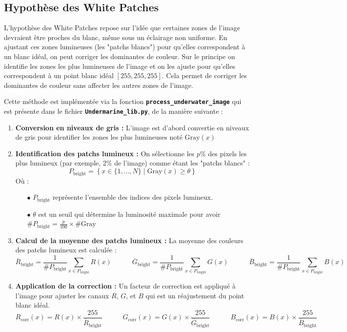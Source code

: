 \documentclass[10pt, a4paper]{extarticle}
\numberwithin{equation}{section}
\numberwithin{figure}{section}
\begin{document}
\subsection{Hypothèse des White Patches}\label{WP}

L’hypothèse des White Patches repose sur l’idée que certaines zones de l’image devraient être proches du blanc, même sous un éclairage non uniforme. En ajustant ces zones lumineuses (les "patchs blancs") pour qu'elles correspondent à un blanc idéal, on peut corriger les dominantes de couleur. Sur le principe on identifie les zones les plus lumineuses de l’image et on les ajuste pour qu’elles correspondent à un point blanc idéal \([255, 255, 255]\). Cela permet de corriger les dominantes de couleur sans affecter les autres zones de l’image.
\par Cette méthode est implémentée via la fonction \colorbox{gray!15}{\texttt{\textbf{process\_underwater\_image}}} qui est présente dans le fichier \colorbox{gray!15}{\texttt{\textbf{Undermarine\_lib.py}}}, de la manière suivante :

\begin{enumerate}
    \item \textbf{Conversion en niveaux de gris :} L'image est d'abord convertie en niveaux de gris pour identifier les zones les plus lumineuses noté $\text{Gray}(x)$
    
    \item \textbf{Identification des patchs lumineux :} On sélectionne les \( p\% \) des pixels les plus lumineux (par exemple, 2\% de l'image) comme étant les "patchs blancs" :
    \[
P_{\text{bright}} = \left\{ x \in \{1, \dots, N\} \mid \text{Gray}(x) \geq \theta \right\}
\]
Où :
\begin{itemize}
    \item[$\bullet$] \( P_{\text{bright}} \) représente l'ensemble des indices des pixels lumineux.
    \item[$\bullet$] \( \theta \) est un seuil qui détermine la luminosité maximale pour avoir $\#P_{\text{bright}} = \frac{p}{100} \times \#\text{Gray}$
\end{itemize}

    \item \textbf{Calcul de la moyenne des patchs lumineux :} La moyenne des couleurs des patchs lumineux est calculée :
    $$
    \bar{R}_{\text{bright}} = \frac{1}{\#P_{\text{bright}}} \sum_{x\in P_{\text{bright}}} R(x) \quad\quad\quad \bar{G}_{\text{bright}} = \frac{1}{\#P_{\text{bright}}} \sum_{x\in P_{\text{bright}}} G(x) \quad\quad\quad \bar{B}_{\text{bright}} = \frac{1}{\#P_{\text{bright}}} \sum_{x\in P_{\text{bright}}} B(x)
    $$

    \item \textbf{Application de la correction :} Un facteur de correction est appliqué à l'image pour ajuster les canaux \( R \), \( G \), et \( B \) qui est un réajustement du point blanc idéal.
    $$
    R_{\text{corr}}(x) = R(x) \times \frac{255}{\bar{R}_{\text{bright}}} \quad\quad\quad G_{\text{corr}}(x) = G(x) \times \frac{255}{\bar{G}_{\text{bright}}} \quad\quad\quad B_{\text{corr}}(x) = B(x) \times \frac{255}{\bar{B}_{\text{bright}}}
    $$
\end{enumerate}
\end{document}
